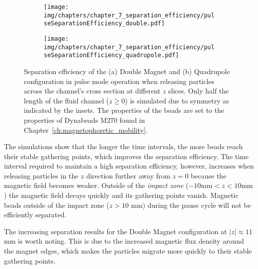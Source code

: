 \begin{figure}[htb]
        \centering
        \begin{subfigure}[b]{0.48\textwidth}
                \texttt{[image: img/chapters/chapter\_7\_separation\_efficiency/pulseSeparationEfficiency\_double.pdf]}
                \caption{}  
                \label{fig:separationEfficiencyPulseModeDouble}
        \end{subfigure}      
        \hfill                  
        \begin{subfigure}[b]{0.48\textwidth}
                \texttt{[image: img/chapters/chapter\_7\_separation\_efficiency/pulseSeparationEfficiency\_quadrupole.pdf]}
                \caption{}
                \label{fig:separationEfficiencyPulseModeQuadrupole}
        \end{subfigure}         
        \caption[Pulse mode separation efficiency of the Double Magnet and Quadrupole configuration]{Separation efficiency of the (a) Double Magnet and (b) Quadrupole configuration in pulse mode operation when releasing particles across the channel's cross section at different $z$ slices. Only half the length of the fluid channel ($z \geq 0$) is simulated due to symmetry as indicated by the insets. The properties of the beads are set to the properties of Dynabeads M270 found in Chapter~\ref{ch:magnetophoretic_mobility}.}
        \label{fig:separationEfficiencyPulseMode}
\end{figure}

The simulations show that the longer the time intervals, the more beads reach their stable gathering points, which improves the separation efficiency. The time interval required to maintain a high separation efficiency, however, increases when releasing particles in the $z$ direction further away from $z=0$ because the magnetic field becomes weaker. Outside of the \textit{impact zone}  ($-10 \text{mm} < z < 10 \text{mm}$) the magnetic field decays quickly and its gathering points vanish. Magnetic beads outside of the impact zone ($z>10$ mm) during the pause cycle will not be efficiently separated.

The increasing separation results for the Double Magnet configuration at $|z| \approx 11$ mm is worth noting. This is due to the increased magnetic flux density around the magnet edges, which makes the particles migrate more quickly to their stable gathering points. 

